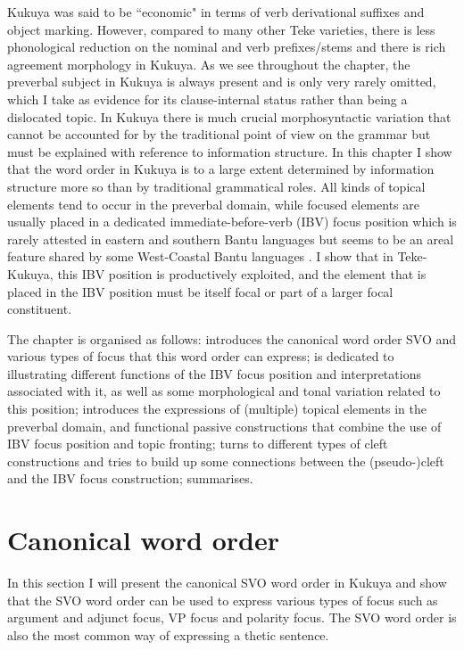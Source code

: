 \documentclass[output=paper,colorlinks,citecolor=brown,
]{langscibook}
\begin{document}
Kukuya was said to be ``economic" \citep{Paulian1998, Paulian2001} in terms of verb derivational suffixes and object marking. However, compared to many other Teke varieties, there is less phonological reduction on the nominal and verb prefixes/stems and there is rich agreement morphology in Kukuya. As we see throughout the chapter, the preverbal subject in Kukuya is always present and is only very rarely omitted, which I take as evidence for its clause-internal status rather than being a dislocated topic. In Kukuya there is much crucial morphosyntactic variation that cannot be accounted for by the traditional point of view on the grammar but must be explained with reference to information structure. In this chapter I show that the word order in Kukuya is to a large extent determined by information structure more so than by traditional grammatical roles. All kinds of topical elements tend to occur in the preverbal domain, while focused elements are usually placed in a dedicated immediate-before-verb (IBV) focus position which is rarely attested in eastern and southern Bantu languages but seems to be an areal feature shared by some West-Coastal Bantu languages \citep{Grégoire1993, Hadermann1996, BostoenMundeke2011, BostoenMundeke2012, DeKind2014, KoniMuluwaBostoen2014, BostoenKoniMuluwa2021}. I show that in Teke-Kukuya, this IBV position is productively exploited, and the element that is placed in the IBV position must be itself focal or part of a larger focal constituent.


The chapter is organised as follows:  introduces the canonical word order SVO and various types of focus that this word order can express;  is dedicated to illustrating different functions of the IBV focus position and interpretations associated with it, as well as some morphological and tonal variation related to this position;  introduces the expressions of (multiple) topical elements in the preverbal domain, and functional passive constructions that combine the use of IBV focus position and topic fronting;  turns to different types of cleft constructions and tries to build up some connections between the (pseudo-)cleft and the IBV focus construction;  summarises.
\section{Canonical word order}\label{teke:sec:2}
In this section I will present the canonical SVO word order in Kukuya and show that the SVO word order can be used to express various types of focus such as argument and adjunct focus, VP focus and polarity focus. The SVO word order is also the most common way of expressing a thetic sentence.
\end{document}
